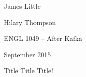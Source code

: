 \documentclass[12pt]{article}
\newcommand{\firstname}{James}
\newcommand{\lastname}{Little}
\newcommand{\mlaHeading}[3] {
    \setlength\parindent{0pt}
    \firstname{} \lastname{}\par#1\par#2\par#3
}
\newcommand{\mlaTitle}[1] {
    \begin{center}
        #1
    \end{center}
    \setlength{\parindent}{0.5in}
}
\begin{document}
\mlaHeading{Hilary Thompson}{ENGL 1049 -- After Kafka}{September 2015}

\mlaTitle{Title Title Title!}

\end{document}
